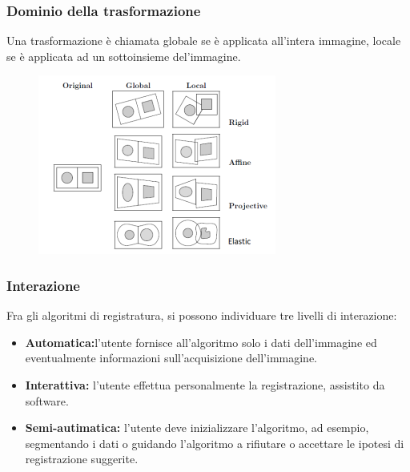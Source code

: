 \subsubsection{Dominio della trasformazione}
Una trasformazione è chiamata globale se è applicata all'intera immagine, locale se è applicata ad un sottoinsieme del'immagine.

\begin{figure}[H]
    \centering
    \includegraphics[width=\linewidth, keepaspectratio]{capitoli/immagini/imgs/dominio-trasformazione.png}
\end{figure}

\subsubsection{Interazione}
Fra gli algoritmi di registratura, si possono individuare tre livelli di
interazione:
\begin{itemize}
    \item \textbf{Automatica:}l'utente fornisce all'algoritmo solo i dati
          dell'immagine ed eventualmente informazioni sull'acquisizione
          dell'immagine.
    \item \textbf{Interattiva:} l'utente effettua personalmente la registrazione,
          assistito da software.
    \item \textbf{Semi-autimatica:} l'utente deve inizializzare l'algoritmo, ad esempio, segmentando i dati o guidando l'algoritmo a rifiutare
          o accettare le ipotesi di registrazione suggerite.
\end{itemize}

